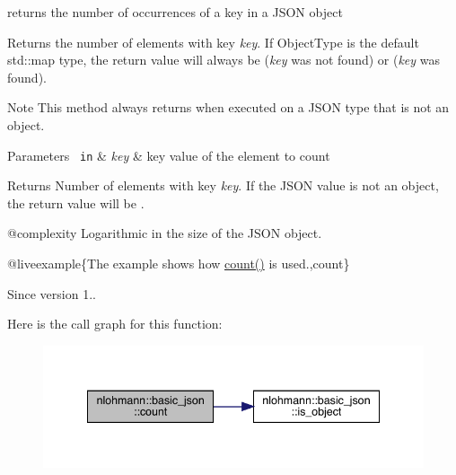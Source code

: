 returns the number of occurrences of a key in a J\+S\+ON object 

Returns the number of elements with key {\itshape key}. If Object\+Type is the default {\ttfamily std\+::map} type, the return value will always be {} ({\itshape key} was not found) or {} ({\itshape key} was found).

\begin{DoxyNote}{Note}
This method always returns {} when executed on a J\+S\+ON type that is not an object.
\end{DoxyNote}

\begin{DoxyParams}[1]{Parameters}
\mbox{\texttt{ in}}  & {\em key} & key value of the element to count\\
\hline
\end{DoxyParams}
\begin{DoxyReturn}{Returns}
Number of elements with key {\itshape key}. If the J\+S\+ON value is not an object, the return value will be {}.
\end{DoxyReturn}
@complexity Logarithmic in the size of the J\+S\+ON object.

@liveexample\{The example shows how {\ttfamily \mbox{\hyperlink{classnlohmann_1_1basic__json_a5261eba9637f59d17d6cab5f14ce5747}{count()}}} is used.,count\}

\begin{DoxySince}{Since}
version 1.. 
\end{DoxySince}
Here is the call graph for this function\+:
\nopagebreak
\begin{figure}[H]
\begin{center}
\leavevmode
\includegraphics[width=341pt]{classnlohmann_1_1basic__json_a5261eba9637f59d17d6cab5f14ce5747_cgraph}
\end{center}
\end{figure}
\mbox{\label{classnlohmann_1_1basic__json_a1e0769d22d54573f294da0e5c6abc9de}} 
